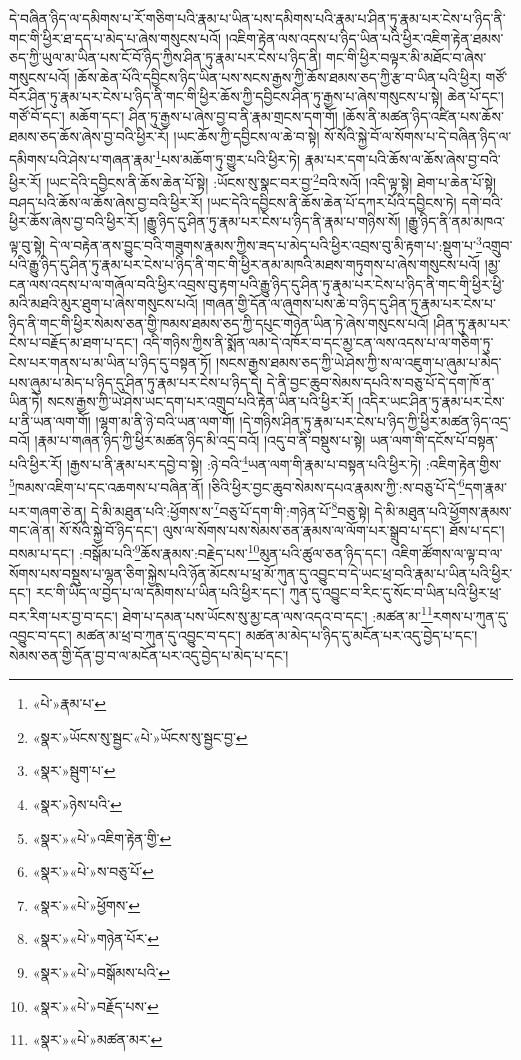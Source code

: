 དེ་བཞིན་ཉིད་ལ་དམིགས་པ་རོ་གཅིག་པའི་རྣམ་པ་ཡིན་པས་དམིགས་པའི་རྣམ་པ་ཤིན་ཏུ་རྣམ་པར་ངེས་པ་ཉིད་ནི་གང་གི་ཕྱིར་ཐ་དད་པ་མེད་པ་ཞེས་གསུངས་པའོ། །འཇིག་རྟེན་ལས་འདས་པ་ཉིད་ཡིན་པའི་ཕྱིར་འཇིག་རྟེན་ཐམས་ཅད་ཀྱི་ཡུལ་མ་ཡིན་པས་ངོ་བོ་ཉིད་ཀྱིས་ཤིན་ཏུ་རྣམ་པར་ངེས་པ་ཉིད་ནི། གང་གི་ཕྱིར་བལྟར་མི་མཐོང་བ་ཞེས་གསུངས་པའོ། །ཆོས་ཆེན་པོའི་དབྱིངས་ཉིད་ཡིན་པས་སངས་རྒྱས་ཀྱི་ཆོས་ཐམས་ཅད་ཀྱི་རྩ་བ་ཡིན་པའི་ཕྱིར། གཙོ་བོར་ཤིན་ཏུ་རྣམ་པར་ངེས་པ་ཉིད་ནི་གང་གི་ཕྱིར་ཆོས་ཀྱི་དབྱིངས་ཤིན་ཏུ་རྒྱས་པ་ཞེས་གསུངས་པ་སྟེ། ཆེན་པོ་དང་། གཙོ་བོ་དང་། མཆོག་དང་། ཤིན་ཏུ་རྒྱས་པ་ཞེས་བྱ་བ་ནི་རྣམ་གྲངས་དག་གོ། །ཆོས་ནི་མཚན་ཉིད་འཛིན་པས་ཆོས་ཐམས་ཅད་ཆོས་ཞེས་བྱ་བའི་ཕྱིར་རོ། །ཡང་ཆོས་ཀྱི་དབྱིངས་ལ་ཆེ་བ་སྟེ། སོ་སོའི་སྐྱེ་བོ་ལ་སོགས་པ་དེ་བཞིན་ཉིད་ལ་དམིགས་པའི་ཤེས་པ་གཞན་རྣམ་\footnote{«པེ་»རྣམ་པ་}པས་མཆོག་ཏུ་གྱུར་པའི་ཕྱིར་ཏེ། རྣམ་པར་དག་པའི་ཆོས་ལ་ཆོས་ཞེས་བྱ་བའི་ཕྱིར་རོ། །ཡང་དེའི་དབྱིངས་ནི་ཆོས་ཆེན་པོ་སྟེ། :ཡོངས་སུ་སྣང་བར་བྱ་\footnote{«སྣར་»ཡོངས་སུ་སྦྱང་«པེ་»ཡོངས་སུ་སྦྱང་བྱ་}བའི་སའོ། །འདི་ལྟ་སྟེ། ཐེག་པ་ཆེན་པོ་སྟེ། བཤད་པའི་ཆོས་ལ་ཆོས་ཞེས་བྱ་བའི་ཕྱིར་རོ། །ཡང་དེའི་དབྱིངས་ནི་ཆོས་ཆེན་པོ་དཀར་པོའི་དབྱིངས་ཏེ། དགེ་བའི་ཕྱིར་ཆོས་ཞེས་བྱ་བའི་ཕྱིར་རོ། །རྒྱུ་ཉིད་དུ་ཤིན་ཏུ་རྣམ་པར་ངེས་པ་ཉིད་ནི་རྣམ་པ་གཉིས་སོ། །རྒྱུ་ཉིད་ནི་ནམ་མཁའ་ལྟ་བུ་སྟེ། དེ་ལ་བརྟེན་ནས་བྱུང་བའི་གཟུགས་རྣམས་ཀྱིས་ཟད་པ་མེད་པའི་ཕྱིར་འབྲས་བུ་མི་རྟག་པ་:སྡུག་པ་\footnote{«སྣར་»སྦུག་པ་}འགྲུབ་པའི་རྒྱུ་ཉིད་དུ་ཤིན་ཏུ་རྣམ་པར་ངེས་པ་ཉིད་ནི་གང་གི་ཕྱིར་ནམ་མཁའི་མཐས་གཏུགས་པ་ཞེས་གསུངས་པའོ། །མྱ་ངན་ལས་འདས་པ་ལ་གཞོལ་བའི་ཕྱིར་འབྲས་བུ་རྟག་པའི་རྒྱུ་ཉིད་དུ་ཤིན་ཏུ་རྣམ་པར་ངེས་པ་ཉིད་ནི་གང་གི་ཕྱིར་ཕྱི་མའི་མཐའི་མུར་ཐུག་པ་ཞེས་གསུངས་པའོ། །གཞན་གྱི་དོན་ལ་ཞུགས་པས་ཆེ་བ་ཉིད་དུ་ཤིན་ཏུ་རྣམ་པར་ངེས་པ་ཉིད་ནི་གང་གི་ཕྱིར་སེམས་ཅན་གྱི་ཁམས་ཐམས་ཅད་ཀྱི་དཔུང་གཉེན་ཡིན་ཏེ་ཞེས་གསུངས་པའོ། །ཤིན་ཏུ་རྣམ་པར་ངེས་པ་བརྗོད་མ་ཐག་པ་དང་། འདི་གཉིས་ཀྱིས་ནི་སྨོན་ལམ་དེ་འཁོར་བ་དང་མྱ་ངན་ལས་འདས་པ་ལ་གཅིག་ཏུ་ངེས་པར་གནས་པ་མ་ཡིན་པ་ཉིད་དུ་བསྟན་ཏོ། །སངས་རྒྱས་ཐམས་ཅད་ཀྱི་ཡེ་ཤེས་ཀྱི་ས་ལ་འཇུག་པ་ཞུམ་པ་མེད་པས་ཞུམ་པ་མེད་པ་ཉིད་དུ་ཤིན་ཏུ་རྣམ་པར་ངེས་པ་ཉིད་དེ། དེ་ནི་བྱང་ཆུབ་སེམས་དཔའི་ས་བཅུ་པོ་དེ་དག་ཁོ་ན་ཡིན་ཏེ། སངས་རྒྱས་ཀྱི་ཡེ་ཤེས་ཡང་དག་པར་འགྲུབ་པའི་རྟེན་ཡིན་པའི་ཕྱིར་རོ། །འདིར་ཡང་ཤིན་ཏུ་རྣམ་པར་ངེས་པ་ནི་ཡན་ལག་གོ། །ལྷག་མ་ནི་ཉེ་བའི་ཡན་ལག་གོ། །དེ་གཉིས་ཤིན་ཏུ་རྣམ་པར་ངེས་པ་ཉིད་ཀྱི་ཕྱིར་མཚན་ཉིད་འདྲ་བའོ། །རྣམ་པ་གཞན་ཉིད་ཀྱི་ཕྱིར་མཚན་ཉིད་མི་འདྲ་བའོ། །འདུ་བ་ནི་བསྡུས་པ་སྟེ། ཡན་ལག་གི་དངོས་པོ་བསྟན་པའི་ཕྱིར་རོ། །རྒྱས་པ་ནི་རྣམ་པར་དབྱེ་བ་སྟེ། :ཉེ་བའི་\footnote{«སྣར་»ཉེས་པའི་}ཡན་ལག་གི་རྣམ་པ་བསྟན་པའི་ཕྱིར་ཏེ། :འཇིག་རྟེན་གྱིས་\footnote{«སྣར་»«པེ་»འཇིག་རྟེན་གྱི་}ཁམས་འཇིག་པ་དང་འཆགས་པ་བཞིན་ནོ། །ཅིའི་ཕྱིར་བྱང་ཆུབ་སེམས་དཔའ་རྣམས་ཀྱི་:ས་བཅུ་པོ་དེ་\footnote{«སྣར་»«པེ་»ས་བཅུ་པོ་}དག་རྣམ་པར་གཞག་ཅེ་ན། དེ་མི་མཐུན་པའི་:ཕྱོགས་ས་\footnote{«སྣར་»«པེ་»ཕྱོགས་}བཅུ་པོ་དག་གི་:གཉེན་པོ་\footnote{«སྣར་»«པེ་»གཉེན་པོར་}བཅུ་སྟེ། དེ་མི་མཐུན་པའི་ཕྱོགས་རྣམས་གང་ཞེ་ན། སོ་སོའི་སྐྱེ་བོ་ཉིད་དང་། ལུས་ལ་སོགས་པས་སེམས་ཅན་རྣམས་ལ་ལོག་པར་སྒྲུབ་པ་དང་། ཐོས་པ་དང་། བསམ་པ་དང་། :བསྒོམ་པའི་\footnote{«སྣར་»«པེ་»བསྒོམས་པའི་}ཆོས་རྣམས་:བརྗེད་པས་\footnote{«སྣར་»«པེ་»བརྗོད་པས་}མུན་པའི་ཚུལ་ཅན་ཉིད་དང་། འཇིག་ཚོགས་ལ་ལྟ་བ་ལ་སོགས་པས་བསྡུས་པ་ལྷན་ཅིག་སྐྱེས་པའི་ཉོན་མོངས་པ་ཕྲ་མོ་ཀུན་དུ་འབྱུང་བ་དེ་ཡང་ཕྲ་བའི་རྣམ་པ་ཡིན་པའི་ཕྱིར་དང་། རང་གི་ཡིད་ལ་བྱེད་པ་ལ་དམིགས་པ་ཡིན་པའི་ཕྱིར་དང་། ཀུན་དུ་འབྱུང་བ་རིང་དུ་སོང་བ་ཡིན་པའི་ཕྱིར་ཕྲ་བར་རིག་པར་བྱ་བ་དང་། ཐེག་པ་དམན་པས་ཡོངས་སུ་མྱ་ངན་ལས་འདའ་བ་དང་། :མཚན་མ་\footnote{«སྣར་»«པེ་»མཚན་མར་}རགས་པ་ཀུན་དུ་འབྱུང་བ་དང་། མཚན་མ་ཕྲ་བ་ཀུན་དུ་འབྱུང་བ་དང་། མཚན་མ་མེད་པ་ཉིད་དུ་མངོན་པར་འདུ་བྱེད་པ་དང་། སེམས་ཅན་གྱི་དོན་བྱ་བ་ལ་མངོན་པར་འདུ་བྱེད་པ་མེད་པ་དང་། 